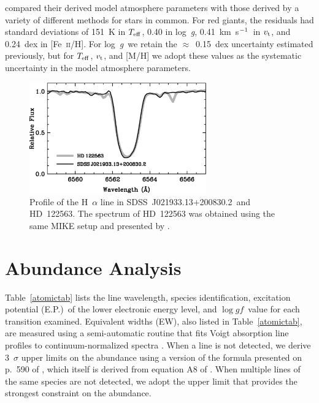 \documentclass[useAMS,usenatbib,usegraphicx]{mn2e}
\def\kmsec{\mbox{km~s$^{\rm -1}$}}
\def\logg{\mbox{log~{\it g}}}
\def\teff{\mbox{$T_{\rm eff}$}}
\def\vt{\mbox{$v_{\rm t}$}}
\def\loggf{$\log gf$}
\def\segalt{\mbox{SDSS~J021933.13$+$200830.2}}
\begin{document}
\citet{roederer14} compared their derived model atmosphere parameters
with those derived by a variety of different methods
for stars in common.
For red giants, the residuals had standard deviations of
151~K in \teff,
0.40 in \logg,
0.41~\kmsec\ in \vt, and
0.24~dex in [Fe~\textsc{ii}/H].
For \logg\ we retain the $\approx$~0.15~dex uncertainty
estimated previously, but for \teff, \vt, and [M/H]
we adopt these values as the systematic uncertainty in 
the model atmosphere parameters.


\begin{figure}
\centering
\includegraphics[angle=00,width=3.0in]{fig2.eps}
\caption{
\label{halphaplot}
Profile of the H~$\alpha$ line in 
\segalt\ and \mbox{HD~122563}.
The spectrum of \mbox{HD~122563} was obtained
using the same MIKE setup and presented by \citet{roederer14}.
}
\end{figure}


\section{Abundance Analysis}
\label{analysis}


Table~\ref{atomictab} lists the
line wavelength, species identification,
excitation potential (E.P.)\ of the lower electronic energy level,
and \loggf\ value
for each transition examined.
Equivalent widths (EW), also listed in Table~\ref{atomictab}, 
are measured using a
semi-automatic routine that fits Voigt absorption line profiles
to continuum-normalized spectra
\citep{roederer14}.
When a line is not detected, 
we derive 3~$\sigma$ upper limits on the abundance using
a version of the formula presented on p.\ 590 of
\citet{frebel08}, which itself is derived from
equation A8 of \citet{bohlin83}.
When multiple lines of the same species are not detected,
we adopt the upper limit that provides the
strongest constraint on the abundance.
\end{document}
